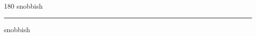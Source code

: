 
\begin{frame}
\begin{center}
\begin{turn}{180}
{\fontsize{2.5cm}{1em}\selectfont snobbish}
\end{turn}
\vspace{1em}\par  
\hrule
\vspace{1em}\par  
{\fontsize{2.5cm}{1em}\selectfont snobbish}
\end{center}
\end{frame}
